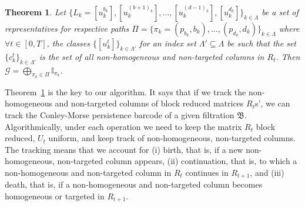 \documentclass[letterpaper,11pt]{article}
\theoremstyle{plain}
\newtheorem{theorem}{Theorem}[section]
\theoremstyle{definition}
\newcommand{\zzBD}{\mathfrak{B}}
\begin{document}
\begin{theorem}
Let $\{L_k=[u_k^{b_k}],[u_k^{(b+1)_k}],\ldots,[u_k^{(d-1)_k}],[u_k^{d_k}]\}_{k\in\Lambda}$ 
    be a set
    of representatives for
    respective paths $\Pi=\{\pi_k=(p_{b_k},b_k),\ldots,(p_{d_k},d_k)\}_{k\in \Lambda}$    
    where $\forall t\in [0,T]$, the classes $\{[u_k^{t}]\}_{k\in \Lambda'}$
    for an index set $\Lambda'\subseteq \Lambda$ be such that the set $\{c_k^t\}_{k\in \Lambda'}$ is the set of all
    non-homogeneous and non-targeted columns in $R_t$. Then $\mathcal G=\bigoplus_{\pi_k\in \Pi} \mathbb{I}_{\pi_k}$.
    \label{thm:barcode}
\end{theorem}
    

Theorem~\ref{thm:barcode} is the key to our algorithm. It says that if we track the non-homogeneous and non-targeted columns of block reduced matrices $R_t$s', we can track the Conley-Morse persistence barcode of a given filtration $\zzBD$. Algorithmically, under each operation we need to 
keep the matrix $R_t$ block reduced, $U_t$ uniform, and keep track of
non-homogeneous, non-targeted columns. 
The tracking means that we account
for (i) birth, that is, if a new non-homogeneous, non-targeted column appears,
(ii) continuation, that is, to which a non-homogeneous and
non-targeted column in $R_t$ continues in $R_{t+1}$,
and (iii) death, that is, if a non-homogeneous and non-targeted column becomes
homogeneous or targeted in $R_{t+1}$.

\end{document}
